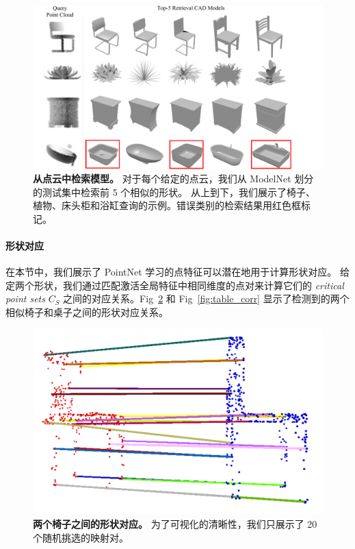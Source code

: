 \begin{figure}[h]
    \centering
    \includegraphics[width=\linewidth]{fig/retrieval.pdf}
    \caption{\textbf{从点云中检索模型。} 对于每个给定的点云，我们从 ModelNet 划分的测试集中检索前 5 个相似的形状。 从上到下，我们展示了椅子、植物、床头柜和浴缸查询的示例。错误类别的检索结果用红色框标记。}
    \label{fig:retrieval}
\end{figure}

\paragraph{形状对应}

在本节中，我们展示了 PointNet 学习的点特征可以潜在地用于计算形状对应。 给定两个形状，我们通过匹配激活全局特征中相同维度的点对来计算它们的 \textit{critical point sets} $C_S$ 之间的对应关系。Fig~\ref{fig:chair_corr} 和 Fig~\ref{fig:table_corr} 显示了检测到的两个相似椅子和桌子之间的形状对应关系。

\begin{figure}[h]
    \centering
    \includegraphics[width=\linewidth]{fig/chair_corr.png}
    \caption{\textbf{两个椅子之间的形状对应。} 为了可视化的清晰性，我们只展示了 20 个随机挑选的映射对。}
    \label{fig:chair_corr}
\end{figure}


